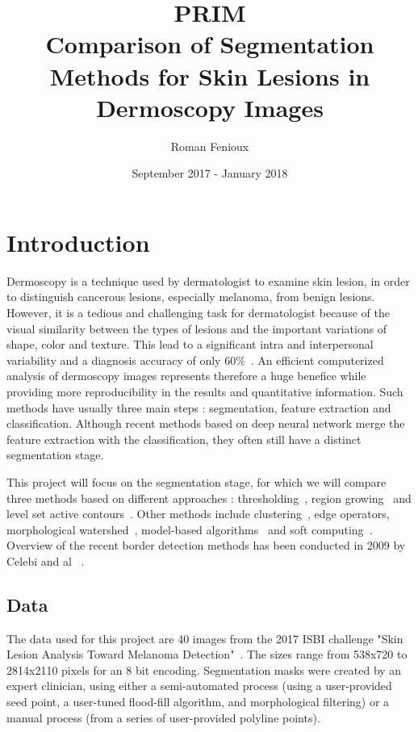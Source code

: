 \documentclass[a4paper,10pt]{article}
\title{PRIM\\ Comparison of Segmentation Methods for Skin Lesions in Dermoscopy Images}
\author{Roman Fenioux}
\date{September 2017 - January 2018}
\begin{document}
\maketitle
\newpage
\section*{Introduction}
Dermoscopy is a technique used by dermatologist to examine skin lesion, in order to distinguish cancerous lesions, especially melanoma, from benign lesions. However, it is a tedious and challenging task for dermatologist because of the visual similarity between the types of lesions and the important variations of shape, color and texture. This lead to a significant intra and interpersonal variability and a diagnosis accuracy of only 60\%~\cite{kittler_diagnostic_2002}. An efficient computerized analysis of dermoscopy images represents therefore a huge benefice while providing more reproducibility in the results and quantitative information. Such methods have usually three main steps : segmentation, feature extraction and classification. Although recent methods based on deep neural network merge the feature extraction with the classification, they often still have a distinct segmentation stage. 

This project will focus on the segmentation stage, for which we will compare three methods based on different approaches : thresholding~\cite{Garnavi2010}, region growing~\cite{celebi_border_2008} and level set active contours~\cite{li2010distance}. Other methods include clustering~\cite{gomez_independent_2008}, edge operators, morphological watershed~\cite{schmid_lesion_1999}, model-based algorithms~\cite{gao_segmentation_1998} and soft computing~\cite{yu_automated_2017}.
Overview of the recent border detection methods has been conducted in 2009 by Celebi and al ~\cite{celebi_lesion_2009}.

\subsection*{Data}

The data used for this project are 40 images from the 2017 ISBI challenge "Skin Lesion Analysis Toward Melanoma Detection"~\cite{codella_skin_2017}. The sizes range from 538x720 to 2814x2110 pixels for an 8 bit encoding. Segmentation masks were created by an expert clinician, using either a semi-automated process (using a user-provided seed point, a user-tuned flood-fill algorithm, and morphological filtering) or a manual process (from a series of user-provided polyline points). 
\end{document}
